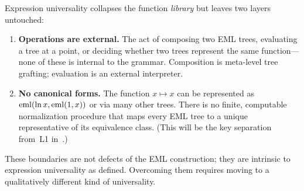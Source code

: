 Expression universality collapses the function \emph{library} but
leaves two layers untouched:

\begin{enumerate}[label=(\roman*)]
\item \textbf{Operations are external.}
  The act of composing two EML trees, evaluating a tree at a point,
  or deciding whether two trees represent the same function---none
  of these is internal to the grammar.
  Composition is meta-level tree grafting; evaluation is an external
  interpreter.

\item \textbf{No canonical forms.}
  The function $x \mapsto x$ can be represented as
  $\operatorname{eml}(\ln x, \operatorname{eml}(1,x))$ or via many other trees.
  There is no finite, computable normalization procedure
  that maps every EML tree to a unique representative of its
  equivalence class.  (This will be the key separation from~L1
  in~.)
\end{enumerate}

These boundaries are not defects of the EML construction; they are
intrinsic to expression universality as defined.  Overcoming them
requires moving to a qualitatively different kind of universality.
